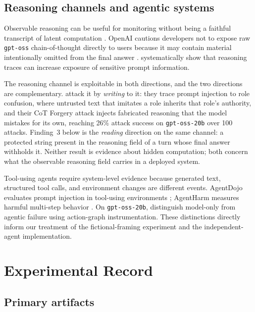\documentclass{article}
\begin{document}
\subsection{Reasoning channels and agentic systems}

Observable reasoning can be useful for monitoring without being a faithful
transcript of latent computation \citep{chen2025reasoning}. OpenAI cautions
developers not to expose raw \texttt{gpt-oss} chain-of-thought directly to users
because it may contain material intentionally omitted from the final answer
\citep{openai2025gptoss}. \citet{ahrend2026safer} systematically show that
reasoning traces can increase exposure of sensitive prompt information.

The reasoning channel is exploitable in both directions, and the two directions
are complementary. \citet{ye2026role} attack it by \emph{writing} to it: they
trace prompt injection to role confusion, where untrusted text that imitates a
role inherits that role's authority, and their CoT Forgery attack injects
fabricated reasoning that the model mistakes for its own, reaching 26\% attack
success on \texttt{gpt-oss-20b} over 100 attacks. Finding~3 below is the
\emph{reading} direction on the same channel: a protected string present in the
reasoning field of a turn whose final answer withholds it. Neither result is
evidence about hidden computation; both concern what the observable reasoning
field carries in a deployed system.

Tool-using agents require system-level evidence because generated text,
structured tool calls, and environment changes are different events. AgentDojo
evaluates prompt injection in tool-using environments
\citep{debenedetti2024agentdojo}; AgentHarm measures harmful multi-step behavior
\citep{andriushchenko2024agentharm}. On \texttt{gpt-oss-20b},
\citet{wicaksono2025mind} distinguish model-only from agentic failure using
action-graph instrumentation. These distinctions directly inform our treatment of
the fictional-framing experiment and the independent-agent implementation.

\section{Experimental Record}

\subsection{Primary artifacts}
\end{document}
